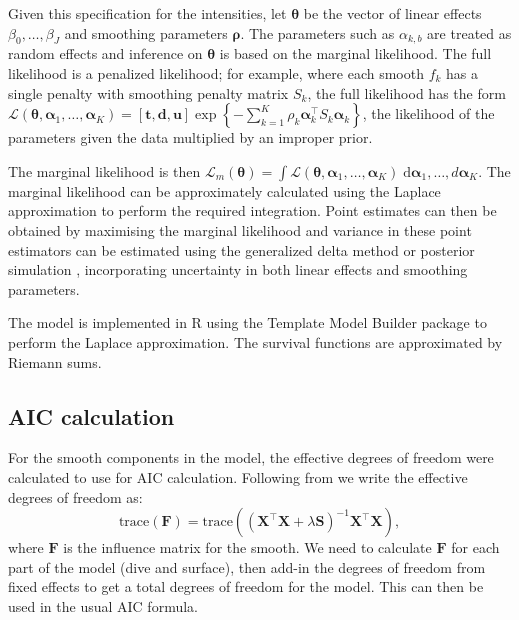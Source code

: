 \documentclass[referee]{rgclass}
\begin{document}
Given this specification for the intensities, let $\bm\theta$ be the vector of linear effects $\beta_0, \ldots, \beta_J$ and smoothing parameters $\bm\rho$.  The parameters such as $\alpha_{k, b}$ are treated as random effects and inference on $\bm\theta$ is based on the marginal likelihood. The full likelihood is a penalized likelihood; for example, where each smooth $f_k$ has a single penalty with smoothing penalty matrix $S_k$, the full likelihood has the form $\mathcal{L}(\bm\theta, \bm\alpha_1, \ldots, \bm\alpha_K) = [\bm{t}, \bm{d}, \bm{u}]\exp\left\{-\sum_{k = 1}^K \rho_k\bm\alpha_k^\intercal S_k \bm\alpha_k\right\}$, the likelihood of the parameters given the data multiplied by an improper prior. 

The marginal likelihood is then $\mathcal{L}_m(\bm\theta) = \int \mathcal{L}(\bm\theta, \bm\alpha_1, \ldots, \bm\alpha_K) \;\mathrm{d}\bm\alpha_1, \ldots,d\bm\alpha_K$. The marginal likelihood can be approximately calculated using the Laplace approximation to perform the required integration. Point estimates can then be obtained by maximising the marginal likelihood and variance in these point estimators can be estimated using the generalized delta method or posterior simulation \citep{wood2016smoothing, wood2017generalized}, incorporating uncertainty in both linear effects and smoothing parameters. 

The model is implemented in R \citep{R} using the Template Model Builder package \citep{TMB} to perform the Laplace approximation. The survival functions are approximated by Riemann sums. 
 
 \subsection{AIC calculation}
 
For the smooth components in the model, the effective degrees of freedom were calculated to use for AIC calculation. Following from \citep[][Section 5.4.2]{wood2017generalized} we write the effective degrees of freedom as:
\begin{equation}
\text{trace}\left(\mathbf{F}\right) = \text{trace}\left((\mathbf{X}^\intercal \mathbf{X} + \lambda \mathbf{S})^{-1} \mathbf{X}^\intercal \mathbf{X}\right),
\end{equation}
where $\mathbf{F}$ is the influence matrix for the smooth. We need to calculate $\mathbf{F}$ for each part of the model (dive and surface), then add-in the degrees of freedom from fixed effects to get a total degrees of freedom for the model. This can then be used in the usual AIC formula.



\end{document}
